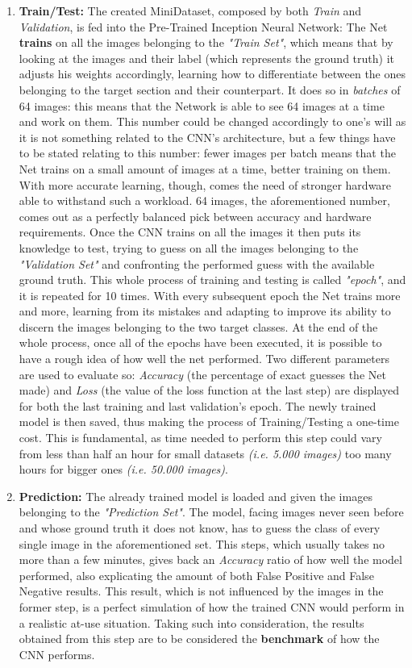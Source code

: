 \documentclass[../main.tex]{subfiles}
\begin{document}
\begin{enumerate}
	\item \textbf{Train/Test:} The created MiniDataset, composed by both \textit{Train} and \textit{Validation}, is fed into the Pre-Trained Inception Neural Network: The Net \textbf{trains} on all the images belonging to the \textit{"Train Set"}, which means that by looking at the images and their label (which represents the ground truth) it adjusts his weights accordingly, learning how to differentiate between the ones belonging to the target section and their counterpart. It does so in \textit{batches} of 64 images: this means that the Network is able to see 64 images at a time and work on them. This number could be changed accordingly to one's will as it is not something related to the CNN's architecture, but a few things have to be stated relating to this number: fewer images per batch means that the Net trains on a small amount of images at a time, better training on them. With more accurate learning, though, comes the need of stronger hardware able to withstand such a workload. 64 images, the aforementioned number, comes out as a perfectly balanced pick between accuracy and hardware requirements. Once the CNN trains on all the images it then puts its knowledge to test, trying to guess on all the images belonging to the \textit{"Validation Set"} and confronting the performed guess with the available ground truth. This whole process of training and testing is called \textit{"epoch"}, and it is repeated for 10 times. With every subsequent epoch the Net trains more and more, learning from its mistakes and adapting to improve its ability to discern the images belonging to the two target classes. At the end of the whole process, once all of the epochs have been executed, it is possible to have a rough idea of how well the net performed. Two different parameters are used to evaluate so: \textit{Accuracy} (the percentage of exact guesses the Net made) and \textit{Loss} (the value of the loss function at the last step) are displayed for both the last training and last validation's epoch. The newly trained model is then saved, thus making the process of Training/Testing a one-time cost. This is fundamental, as time needed to perform this step could vary from less than half an hour for small datasets \textit{(i.e. 5.000 images)} too many hours for bigger ones \textit{(i.e. 50.000 images)}.

	\item \textbf{Prediction:} The already trained model is loaded and given the images belonging to the \textit{"Prediction Set"}. The model, facing images never seen before and whose ground truth it does not know, has to guess the class of every single image in the aforementioned set. This steps, which usually takes no more than a few minutes, gives back an \textit{Accuracy} ratio of how well the model performed, also explicating the amount of both False Positive and False Negative results. This result, which is not influenced by the images in the former step, is a perfect simulation of how the trained CNN would perform in a realistic at-use situation. Taking such into consideration, the results obtained from this step are to be considered the \textbf{benchmark} of how the CNN performs.
\end{enumerate}
\end{document}
